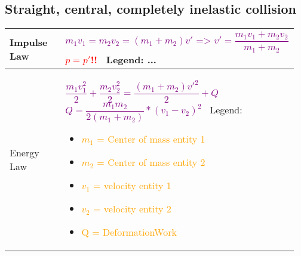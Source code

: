 \documentclass[main.tex,fontsize=8pt,paper=a4,paper=portrait,DIV=calc,]{scrartcl}
\begin{document}
\begin{table}[ht!]
\subsection{Straight, central, completely inelastic collision}
\begin{tabular}{|m{0.2\linewidth}|m{0.755\linewidth}|}
\hline
Impulse Law & 
\vspace{2mm}
\Huge \textcolor{purple}{\( m_1v_1 = m_2v_2 = (m_1 + m_2 )v' \text{ => } v' = \dfrac{m_1v_1 + m_2v_2}{m_1 + m_2}\)}\newline
\textcolor{red}{\( p = p' \)!!}\newline
\normalsize \, \newline
Legend:\newline
...
\\
\hline
Energy Law & 
\vspace{2mm}
\Huge \textcolor{purple}{\( \dfrac{m_1v_1^2}{2} + \dfrac{m_2v_2^2}{2} = \dfrac{(m_1 + m_2)v'^2}{2} + Q \)}\newline
\, \newline
\textcolor{purple}{\(Q = \dfrac{m_1m_2}{2(m_1+m_2)}*(v_1 -v_2)^2\)}\newline
\normalsize \, \newline
Legend:\newline
\begin{itemize}
\item \textcolor{orange}{\(m_1\) = Center of mass entity 1}
\item \textcolor{orange}{\(m_2\) = Center of mass entity 2}
\item \textcolor{orange}{\(v_1\) = velocity entity 1}
\item \textcolor{orange}{\(v_2\) = velocity entity 2}
\item \textcolor{orange}{Q = DeformationWork}
\vspace{-3mm}
\end{itemize} \\
\hline
\end{tabular}

\end{table}
\end{document}
